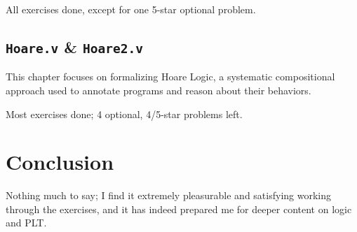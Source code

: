 \documentclass[screen,sigplan]{acmart}\settopmatter{printfolios=true,printccs=false,printacmref=false}
\begin{document}
All exercises done, except for one 5-star optional problem.

\subsection{\texttt{Hoare.v} \& \texttt{Hoare2.v}}
This chapter focuses on formalizing Hoare Logic, a systematic compositional approach used 
to annotate programs and reason about their behaviors.

Most exercises done; 4 optional, 4/5-star problems left.


\section{Conclusion}
Nothing much to say; I find it extremely pleasurable and satisfying working through the
exercises, and it has indeed prepared me for deeper content on logic and PLT.





%



\end{document}
